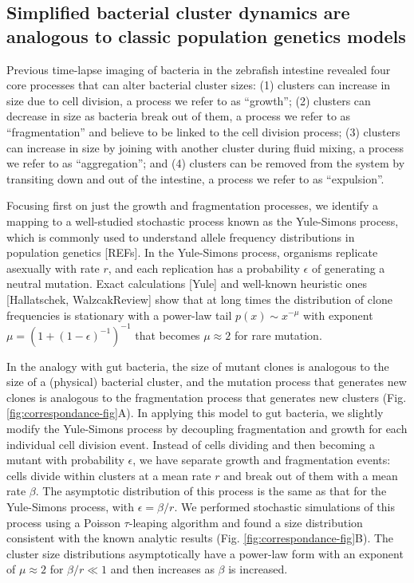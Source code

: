 \documentclass[aps,pre,twocolumn]{revtex4-1}
\begin{document}
\subsection{Simplified bacterial cluster dynamics are analogous to classic population genetics models}
Previous time-lapse imaging of bacteria in the zebrafish intestine revealed four core processes that can alter bacterial cluster sizes: (1) clusters can increase in size due to cell division, a process we refer to as ``growth''; (2) clusters can decrease in size as bacteria break out of them, a process we refer to as ``fragmentation'' and believe to be linked to the cell division process; (3) clusters can increase in size by joining with another cluster during fluid mixing, a process we refer to as ``aggregation''; and (4) clusters can be removed from the system by transiting down and out of the intestine, a process we refer to as ``expulsion''.




Focusing first on just the growth and fragmentation processes, we identify a mapping to a well-studied stochastic process known as the Yule-Simons process, which is commonly used to understand allele frequency distributions in population genetics [REFs]. In the Yule-Simons process, organisms replicate asexually with rate $r$, and each replication has a probability $\epsilon$ of generating a neutral mutation. Exact calculations [Yule] and well-known heuristic ones [Hallatschek, WalzcakReview] show that at long times the distribution of clone frequencies is stationary with a power-law tail $p(x) \sim x^{-\mu}$ with exponent $\mu = (1+(1-\epsilon)^{-1})^{-1}$ that becomes $\mu \approx 2$ for rare mutation.

In the analogy with gut bacteria, the size of mutant clones is analogous to the size of a (physical) bacterial cluster, and the mutation process that generates new clones is analogous to the fragmentation process that generates new clusters (Fig. \ref{fig:correspondance-fig}A). In applying this model to gut bacteria, we slightly modify the Yule-Simons process by decoupling fragmentation and growth for each individual cell division event. Instead of cells dividing and then becoming a mutant with probability $\epsilon$, we have separate growth and fragmentation events: cells divide within clusters at a mean rate $r$ and break out of them with a mean rate $\beta$. The asymptotic distribution of this process is the same as that for the Yule-Simons process, with $\epsilon = \beta/r$. We performed stochastic simulations of this process using a Poisson $\tau$-leaping algorithm and found a size distribution consistent with the known analytic results (Fig. \ref{fig:correspondance-fig}B). The cluster size distributions asymptotically have a power-law form with an exponent of $\mu \approx 2$ for $\beta/r \ll 1$ and then increases as $\beta$ is increased. 
\end{document}
